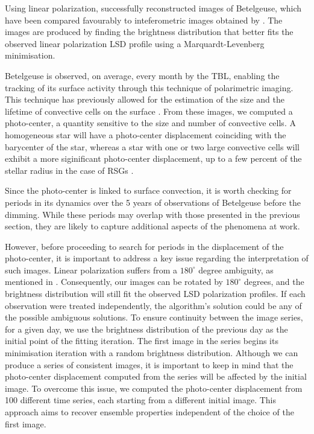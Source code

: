 \documentclass{aa}
\begin{document}
Using linear polarization, \cite{lopez_ariste_convective_2018} successfully reconstructed images of Betelgeuse, which have been compared favourably to inteferometric images obtained by \cite{montarges_close_2016}. The images are produced by finding the brightness distribution that better fits the observed linear 
polarization LSD profile using a Marquardt-Levenberg minimisation.

Betelgeuse is observed, on average, every month by the TBL, enabling the tracking of its surface activity through this technique of polarimetric imaging. This technique has previously allowed for the estimation of  the size and the
 lifetime of convective cells on the surface \citep{lopez_ariste_convective_2018}. From these images, we computed a photo-center, a quantity sensitive to the size and number of convective cells. 
A homogeneous star will have a photo-center displacement coinciding with the barycenter of the star, whereas a star with one or two large convective cells will exhibit a more siginificant photo-center displacement, up to a few percent of the stellar radius in the case of RSGs \citep{chiavassa_probing_2022}. 

Since the photo-center is linked to surface convection, it is worth checking for periods in its 
dynamics over the 5 years of observations of Betelgeuse before the dimming. While these periods may overlap with those presented in the previous section, they are likely to capture additional aspects of the phenomena at work.

However, before proceeding to search for periods in the displacement of the photo-center, it is important to address a key issue regarding the interpretation of such images. 
Linear polarization suffers from a $180 ^\circ$ degree ambiguity, as mentioned in \cite{auriere_discovery_2016}. Consequently, our images 
can be 
rotated by $180^\circ$ degrees, and the brightness distribution will still fit the observed LSD polarization profiles. 
If each observation were treated independently, the algorithm's solution could be any of the possible ambiguous solutions. To ensure continuity 
between the image series, 
for a given day, we use the brightness distribution of the previous day as the initial point 
of the  fitting iteration. The first image in the series begins its minimisation iteration with a random brightness distribution. 
Although we can produce a series of consistent images, it is important to keep in mind that the photo-center displacement computed from the series 
will be affected by the initial image. 
To overcome this issue, we computed
the photo-center displacement from 100 different time series, each starting from a different initial image. This approach aims to recover ensemble properties independent of the choice of the first image. 
\end{document}
